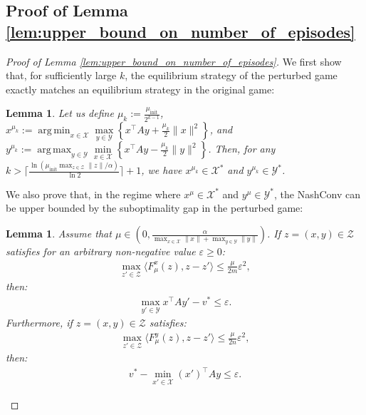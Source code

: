 \documentclass{article}
\DeclareMathOperator*{\argmax}{arg\,max}
\DeclareMathOperator*{\argmin}{arg\,min}
\newcommand{\X}{\mathcal{X}}
\newcommand{\Y}{\mathcal{Y}}
\newcommand{\Z}{\mathcal{Z}}
\theoremstyle{plain}
\newtheorem{lemma}[theorem]{Lemma}
\begin{document}
\subsection{Proof of Lemma \ref{lem:upper_bound_on_number_of_episodes}}
\begin{proof}[Proof of Lemma \ref{lem:upper_bound_on_number_of_episodes}]
    We first show that, for sufficiently large $k$, the equilibrium strategy of the perturbed game exactly matches an equilibrium strategy in the original game:

    \begin{lemma}
        Let us define $\mu_k := \frac{\mu_{\mathrm{init}}}{2^{k-1}}$, $x^{\mu_k} := \argmin_{x\in \X}\max\limits_{y\in \Y}\left\{ x^{\top}Ay + \frac{\mu_k}{2}\|x\|^2\right\}$, and $y^{\mu_k} := \argmax_{y\in \Y}\min\limits_{x\in \X}\left\{ x^{\top}Ay - \frac{\mu_k}{2}\|y\|^2\right\}$.
        Then, for any $k > \lceil \frac{\ln (\mu_{\mathrm{init}}\max_{z\in \Z}\|z\|/\alpha)}{\ln 2}\rceil + 1$, we have $x^{\mu_k}\in \X^{\ast}$ and $y^{\mu_k}\in \Y^{\ast}$.
        \label{lem:optimality_of_perturbed_equilibrium_for_large_k}
    \end{lemma}

    We also prove that, in the regime where $x^{\mu}\in \X^{\ast}$ and $y^{\mu}\in \Y^{\ast}$, the NashConv can be upper bounded by the suboptimality gap in the perturbed game:
    \begin{lemma}
        Assume that $\mu \in (0, \frac{\alpha}{\max_{x\in \X}\|x\| + \max_{y\in \Y}\|y\|})$.
        If $z = (x, y)\in \Z$ satisfies for an arbitrary non-negative value $\varepsilon \geq 0$:
        \begin{align*}
            \max_{z'\in \Z}\langle F_{\mu}^x(z), z - z'\rangle \leq \frac{\mu}{2m}\varepsilon^2,
        \end{align*}
        then:
        \begin{align*}
            \max_{y'\in \Y} x^{\top}Ay' - v^{\ast} \leq \varepsilon.
        \end{align*}
        Furthermore, if $z = (x, y)\in \Z$ satisfies:
        \begin{align*}
            \max_{z'\in \Z}\langle F_{\mu}^y(z), z - z'\rangle \leq \frac{\mu}{2n}\varepsilon^2,
        \end{align*}
        then:
        \begin{align*}
            v^{\ast} - \min_{x'\in \X}(x')^{\top}Ay\leq \varepsilon.
        \end{align*}
        \label{lem:upper_bound_on_gap_by_perturbed_gap}
    \end{lemma}


\end{proof}
\end{document}
